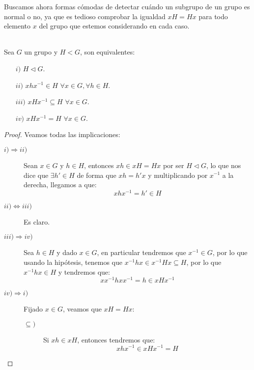 \noindent
Buscamos ahora formas cómodas de detectar cuándo un subgrupo de un grupo es normal o no, ya que es tedioso comprobar la igualdad $xH=Hx$ para todo elemento $x$ del grupo que estemos considerando en cada caso.
\begin{prop}\label{prop:carac_normales}\ \\
    Sea $G$ un grupo y ${H<G}$, son equivalentes:
    \begin{enumerate}
        \item[$i)$] $H\lhd G$.
        \item[$ii)$] $xhx^{-1}\in H$ $\forall x\in G, \forall h\in H$.
        \item[$iii)$] $xHx^{-1}\subseteq H$ $\forall x\in G$.
        \item[$iv)$] $xHx^{-1} = H$ $\forall x\in G$.
    \end{enumerate}
    \begin{proof}
        Veamos todas las implicaciones:
        \begin{description}
            \item [$i)\Longrightarrow ii)$]
                Sean $x\in G$ y $h\in H$, entonces $xh \in xH = Hx$ por ser $H\lhd G$, lo que nos dice que $\exists h'\in H$ de forma que $xh = h'x$ y multiplicando por $x^{-1}$ a la derecha, llegamos a que:
                \begin{equation*}
                    xhx^{-1} = h' \in H
                \end{equation*}
            \item [$ii)\Longleftrightarrow iii)$] Es claro.
            \item [$iii)\Longrightarrow iv)$] Sea $h\in H$ y dado $x\in G$, en particular tendremos que $x^{-1}\in G$, por lo que usando la hipótesis, tenemos que $x^{-1}hx \in x^{-1}Hx \subseteq H$, por lo que $x^{-1}hx\in H$ y tendremos que:
                \begin{equation*}
                    xx^{-1}hxx^{-1} = h \in xHx^{-1}
                \end{equation*}
            \item [$iv)\Longrightarrow i)$] Fijado $x\in G$, veamos que $xH=Hx$:
                \begin{description}
                    \item [$\subseteq)$] Si $xh\in xH$, entonces tendremos que:
                        \begin{equation*}
                            xhx^{-1} \in xHx^{-1}= H

\end{equation*}
\end{description}
\end{description}
\end{proof}
\end{prop}

